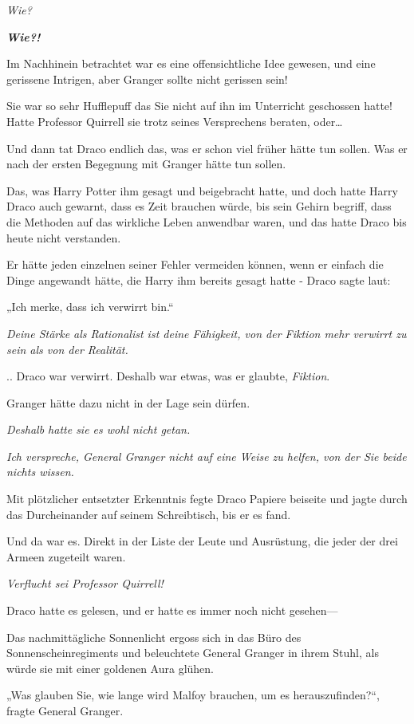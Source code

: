 {\emph{Wie?}

\textbf{\emph{Wie?!}}

Im Nachhinein betrachtet war es eine offensichtliche Idee gewesen, und eine gerissene Intrigen, aber Granger sollte nicht gerissen sein!

Sie war so sehr Hufflepuff das Sie nicht auf ihn im Unterricht geschossen hatte! Hatte Professor Quirrell sie trotz seines Versprechens beraten, oder…

Und dann tat Draco endlich das, was er schon viel früher hätte tun sollen. Was er nach der ersten Begegnung mit Granger hätte tun sollen.

Das, was Harry Potter ihm gesagt und beigebracht hatte, und doch hatte Harry Draco auch gewarnt, dass es Zeit brauchen würde, bis sein Gehirn begriff, dass die Methoden auf das wirkliche Leben anwendbar waren, und das hatte Draco bis heute nicht verstanden.

Er hätte jeden einzelnen seiner Fehler vermeiden können, wenn er einfach die Dinge angewandt hätte, die Harry ihm bereits gesagt hatte - Draco sagte laut:

„Ich merke, dass ich verwirrt bin.“

\emph{Deine Stärke als Rationalist ist deine Fähigkeit, von der Fiktion mehr verwirrt zu sein als von der Realität.}

.. Draco war verwirrt. Deshalb war etwas, was er glaubte, \emph{Fiktion}.

Granger hätte dazu nicht in der Lage sein dürfen.

\emph{Deshalb hatte sie es wohl nicht getan.}

\emph{Ich verspreche, General Granger nicht auf eine Weise zu helfen, von der Sie beide nichts wissen.}

Mit plötzlicher entsetzter Erkenntnis fegte Draco Papiere beiseite und jagte durch das Durcheinander auf seinem Schreibtisch, bis er es fand.

Und da war es. Direkt in der Liste der Leute und Ausrüstung, die jeder der drei Armeen zugeteilt waren.

\emph{Verflucht sei Professor Quirrell!}

Draco hatte es gelesen, und er hatte es immer noch nicht gesehen—

Das nachmittägliche Sonnenlicht ergoss sich in das Büro des Sonnenscheinregiments und beleuchtete General Granger in ihrem Stuhl, als würde sie mit einer goldenen Aura glühen.

„Was glauben Sie, wie lange wird Malfoy brauchen, um es herauszufinden?“, fragte General Granger.

}

